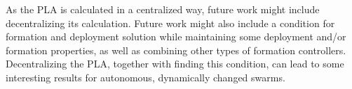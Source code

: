 \documentclass{iacas}
\begin{document}
As the PLA is calculated in a centralized way, future work might include decentralizing its calculation. Future work might also include a condition for formation and deployment solution while maintaining some deployment and/or formation properties, as well as combining other types of formation controllers. Decentralizing the PLA, together with finding this condition, can lead to some interesting results for autonomous, dynamically changed swarms.



\end{document}

